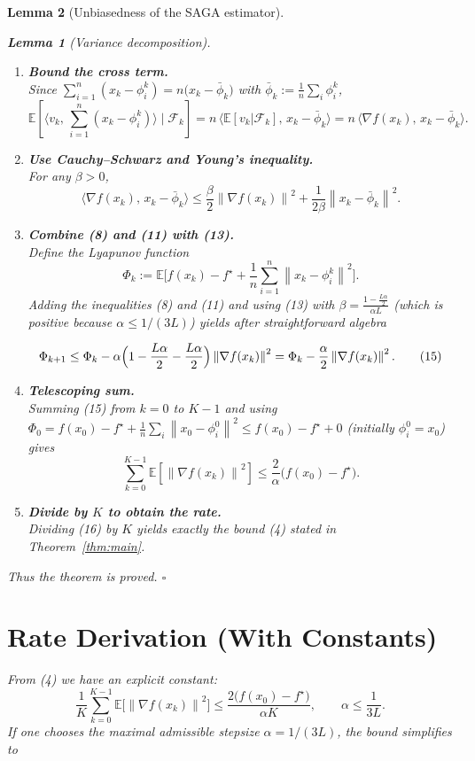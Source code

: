 \documentclass{article}
\newtheorem{lemma}{Lemma}
\newcommand{\E}{\mathbb{E}}
\newcommand{\norm}[1]{\left\|#1\right\|}
\begin{document}
\begin{lemma}[Unbiasedness of the SAGA estimator]
\begin{lemma}[Variance decomposition]
\begin{enumerate}[label=[Step \arabic*],leftmargin=*]
\item \textbf{Bound the cross term.}\\
Since $\sum_{i=1}^{n}(x_k-\phi_i^{k}) = n\bigl(x_k-\bar\phi_k\bigr)$ with
$\bar\phi_k:=\frac1n\sum_i\phi_i^{k}$,
\[
\E\!\left[\langle v_k,\,\sum_{i=1}^{n}(x_k-\phi_i^{k})\rangle\mid\mathcal{F}_k\right]
= n\,\langle \E[v_k|\mathcal{F}_k],\,x_k-\bar\phi_k\rangle
= n\,\langle \nabla f(x_k),\,x_k-\bar\phi_k\rangle .
\tag{12}
\]

\item \textbf{Use Cauchy–Schwarz and Young’s inequality.}\\
For any $\beta>0$,
\[
\langle \nabla f(x_k),\,x_k-\bar\phi_k\rangle
\le \frac{\beta}{2}\norm{\nabla f(x_k)}^{2}
   +\frac{1}{2\beta}\norm{x_k-\bar\phi_k}^{2}.
\tag{13}
\]

\item \textbf{Combine (8) and (11) with (13).}\\
Define the Lyapunov function
\[
\Phi_k:=\E\!\bigl[f(x_k)-f^{\star}
      +\frac{1}{n}\sum_{i=1}^{n}\norm{x_k-\phi_i^{k}}^{2}\bigr].
\tag{14}
\]
Adding the inequalities (8) and (11) and using (13) with
$\beta=\frac{1-\frac{L\alpha}{2}}{\alpha L}$ (which is positive because
$\alpha\le 1/(3L)$) yields after straightforward algebra

\[
\Phi_{k+1}
\le \Phi_k
   -\alpha\Bigl(1-\frac{L\alpha}{2}-\frac{L\alpha}{2}\Bigr)
      \norm{\nabla f(x_k)}^{2}
   =\Phi_k-\frac{\alpha}{2}\norm{\nabla f(x_k)}^{2}.
\tag{15}
\]

\item \textbf{Telescoping sum.}\\
Summing (15) from $k=0$ to $K-1$ and using $\Phi_0=
f(x_0)-f^{\star}+ \frac{1}{n}\sum_i\norm{x_0-\phi_i^{0}}^{2}
\le f(x_0)-f^{\star}+0$ (initially $\phi_i^{0}=x_0$) gives
\[
\sum_{k=0}^{K-1}\E\!\left[\norm{\nabla f(x_k)}^{2}\right]
\le \frac{2}{\alpha}\bigl(f(x_0)-f^{\star}\bigr).
\tag{16}
\]

\item \textbf{Divide by $K$ to obtain the rate.}\\
Dividing (16) by $K$ yields exactly the bound (4) stated in
Theorem~\ref{thm:main}.
\end{enumerate}
Thus the theorem is proved. $\square$

\section*{Rate Derivation (With Constants)}
From (4) we have an explicit constant:
\[
\boxed{\;
\frac{1}{K}\sum_{k=0}^{K-1}\E\!\bigl[\norm{\nabla f(x_k)}^{2}\bigr]
\le \frac{2\bigl(f(x_0)-f^{\star}\bigr)}{\alpha K},
\qquad \alpha\le\frac{1}{3L}.
\;}
\]
If one chooses the maximal admissible stepsize $\alpha=1/(3L)$,
the bound simplifies to  


\end{lemma}
\end{lemma}
\end{document}
